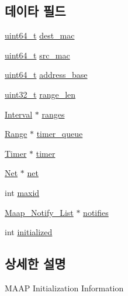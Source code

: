 \subsection*{데이타 필드}
\begin{DoxyCompactItemize}
\item 
\hyperlink{parse_8c_aec6fcb673ff035718c238c8c9d544c47}{uint64\+\_\+t} \hyperlink{struct_maap___client_a205a8c33627111589223916ef80462c2}{dest\+\_\+mac}
\item 
\hyperlink{parse_8c_aec6fcb673ff035718c238c8c9d544c47}{uint64\+\_\+t} \hyperlink{struct_maap___client_ae2c98c9078f80f770e85f937c34da4eb}{src\+\_\+mac}
\item 
\hyperlink{parse_8c_aec6fcb673ff035718c238c8c9d544c47}{uint64\+\_\+t} \hyperlink{struct_maap___client_a35767d757d073fc43d0f1118d5cbdc4e}{address\+\_\+base}
\item 
\hyperlink{parse_8c_a6eb1e68cc391dd753bc8ce896dbb8315}{uint32\+\_\+t} \hyperlink{struct_maap___client_aa1f919567122a4029070948bdfdcf2a3}{range\+\_\+len}
\item 
\hyperlink{intervals_8h_af6f1ab89800839a9266a6dd11c2bc7ce}{Interval} $\ast$ \hyperlink{struct_maap___client_a415d09d180ac60757c9f10728fd42e8a}{ranges}
\item 
\hyperlink{maap_8h_a7224b59335de60a4d7328209ed591ac5}{Range} $\ast$ \hyperlink{struct_maap___client_a9d54ec9961bf59b379abe4e487904bbd}{timer\+\_\+queue}
\item 
\hyperlink{maap__timer_8h_abaeea299a655478cd0fe3e073a20fbe4}{Timer} $\ast$ \hyperlink{struct_maap___client_ad59f2b60cccbf7bd6a43003017d1d01a}{timer}
\item 
\hyperlink{maap__net_8h_a17aa36aaa6be64d7c47eb4ee8cf32e36}{Net} $\ast$ \hyperlink{struct_maap___client_a504c73ff1a68c50e5435dece66bc2772}{net}
\item 
int \hyperlink{struct_maap___client_adf2905c4b99c43f87a111e240a32932b}{maxid}
\item 
\hyperlink{maap_8h_aa1a438ce6dda4d8cf533ceeb49d3fd6a}{Maap\+\_\+\+Notify\+\_\+\+List} $\ast$ \hyperlink{struct_maap___client_a898d3392eb9ff64e224e8fb47d4f59fc}{notifies}
\item 
int \hyperlink{struct_maap___client_ad06983e7f6e71b233ea7ff3dee1952f2}{initialized}
\end{DoxyCompactItemize}


\subsection{상세한 설명}
M\+A\+AP Initialization Information 

